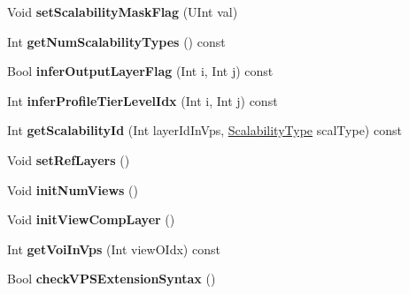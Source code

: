 \begin{DoxyCompactItemize}
\item 
\mbox{\label{class_t_com_v_p_s_a4aa5fd61b9b3c47ff8d35fad30d40d9b}} 
Void {\bfseries set\+Scalability\+Mask\+Flag} (U\+Int val)
\item 
\mbox{\label{class_t_com_v_p_s_ade2ef0ca743e59806a42913816e7a544}} 
Int {\bfseries get\+Num\+Scalability\+Types} () const
\item 
\mbox{\label{class_t_com_v_p_s_ae27d01534883e94f9502d3666deb8a1a}} 
Bool {\bfseries infer\+Output\+Layer\+Flag} (Int i, Int j) const
\item 
\mbox{\label{class_t_com_v_p_s_a26a3c1bdebe6cea7fb124099593f10b0}} 
Int {\bfseries infer\+Profile\+Tier\+Level\+Idx} (Int i, Int j) const
\item 
\mbox{\label{class_t_com_v_p_s_a405feaf31803c437876a28a34ea0c510}} 
Int {\bfseries get\+Scalability\+Id} (Int layer\+Id\+In\+Vps, \hyperlink{_type_def_8h_a07802c9da35e1a2d39714383ead3ce41}{Scalability\+Type} scal\+Type) const
\item 
\mbox{\label{class_t_com_v_p_s_a33278387eb716dd7640e9e02c4c762db}} 
Void {\bfseries set\+Ref\+Layers} ()
\item 
\mbox{\label{class_t_com_v_p_s_a3f664d1522ca90015d8366335aa08470}} 
Void {\bfseries init\+Num\+Views} ()
\item 
\mbox{\label{class_t_com_v_p_s_ab44540968234390b4a83c3000e26472f}} 
Void {\bfseries init\+View\+Comp\+Layer} ()
\item 
\mbox{\label{class_t_com_v_p_s_acc43f4ec85d4b6e60ca809ebf9cf97fb}} 
Int {\bfseries get\+Voi\+In\+Vps} (Int view\+O\+Idx) const
\item 
\mbox{\label{class_t_com_v_p_s_a7c324b68b83c8096318b21fa5068f36c}} 
Bool {\bfseries check\+V\+P\+S\+Extension\+Syntax} ()
\item 
\mbox{\label{class_t_com_v_p_s_afbb46636ff00f2364d9302296b1d1d91}} 

\end{DoxyCompactItemize}
